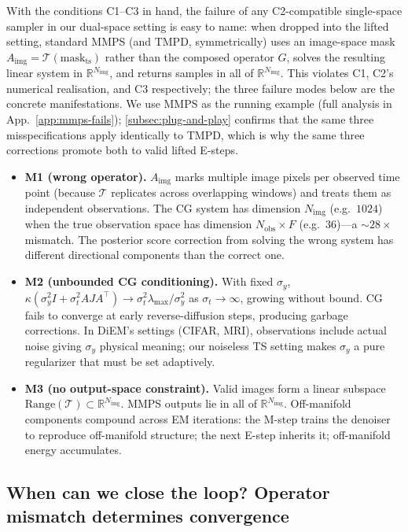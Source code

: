 \documentclass{article}
\theoremstyle{plain}
\theoremstyle{definition}
\theoremstyle{remark}
\newcommand{\tsimg}{\mathcal{T}}
\newcommand{\Nimg}{N_{\mathrm{img}}}
\newcommand{\Nobs}{N_{\mathrm{obs}}}
\newcommand{\Aimg}{A_{\mathrm{img}}}
\begin{document}
With the conditions C1--C3 in hand, the failure of any C2-compatible single-space sampler in our dual-space setting is easy to name: when dropped into the lifted setting, standard MMPS (and TMPD, symmetrically) uses an image-space mask $\Aimg = \tsimg(\mathrm{mask}_{\mathrm{ts}})$ rather than the composed operator $G$, solves the resulting linear system in $\mathbb{R}^{\Nimg}$, and returns samples in all of $\mathbb{R}^{\Nimg}$. This violates C1, C2's numerical realisation, and C3 respectively; the three failure modes below are the concrete manifestations. We use MMPS as the running example (full analysis in App.~\ref{app:mmps-fails}); \cref{subsec:plug-and-play} confirms that the same three misspecifications apply identically to TMPD, which is why the same three corrections promote both to valid lifted E-steps.
\begin{itemize}
\setlength{\itemsep}{0pt}
\item \textbf{M1 (wrong operator).} $\Aimg$ marks multiple image pixels per observed time point (because $\tsimg$ replicates across overlapping windows) and treats them as independent observations. The CG system has dimension $\Nimg$ (e.g.\ $1024$) when the true observation space has dimension $\Nobs \times F$ (e.g.\ $36$)---a $\sim 28\times$ mismatch. The posterior score correction from solving the wrong system has different directional components than the correct one.
\item \textbf{M2 (unbounded CG conditioning).} With fixed $\sigma_y$, $\kappa(\sigma_y^2 I + \sigma_t^2 A J A^\top) \to \sigma_t^2 \lambda_{\max}/\sigma_y^2$ as $\sigma_t \to \infty$, growing without bound. CG fails to converge at early reverse-diffusion steps, producing garbage corrections. In DiEM's settings (CIFAR, MRI), observations include actual noise giving $\sigma_y$ physical meaning; our noiseless TS setting makes $\sigma_y$ a pure regularizer that must be set adaptively.
\item \textbf{M3 (no output-space constraint).} Valid images form a linear subspace $\mathrm{Range}(\tsimg) \subset \mathbb{R}^{\Nimg}$. MMPS outputs lie in all of $\mathbb{R}^{\Nimg}$. Off-manifold components compound across EM iterations: the M-step trains the denoiser to reproduce off-manifold structure; the next E-step inherits it; off-manifold energy accumulates.
\end{itemize}

\vspace{-1mm}
\subsection{When can we close the loop? Operator mismatch determines convergence}
\label{subsec:theorem}
\vspace{-1mm}
\end{document}
